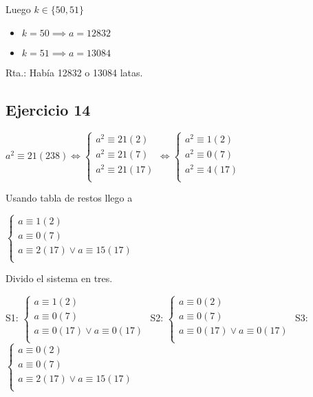 Luego $ k \in \{ 50,51 \} $

\begin{itemize}
    \item $ k = 50 \implies a = 12832 $
    \item $ k = 51 \implies a = 13084 $
\end{itemize}

Rta.: Había 12832 o 13084 latas.

\subsection{Ejercicio 14}

$ a^2 \equiv 21(238) \iff \begin{cases}
    a^2 \equiv 21(2) \\
    a^2 \equiv 21(7) \\
    a^2 \equiv 21(17) \\
\end{cases} 
\iff \begin{cases}
    a^2 \equiv 1(2) \\
    a^2 \equiv 0(7) \\
    a^2 \equiv 4(17) \\
\end{cases} $

Usando tabla de restos llego a

$ \begin{cases}
    a \equiv 1(2) \\
    a \equiv 0(7) \\
    a \equiv 2(17) \vee a\equiv 15(17) \\
\end{cases} $

Divido el sistema en tres.

S1: $ \begin{cases}
    a \equiv 1(2) \\
    a \equiv 0(7) \\
    a \equiv 0(17) \vee a\equiv 0(17) \\
\end{cases} $
S2: $ \begin{cases}
    a \equiv 0(2) \\
    a \equiv 0(7) \\
    a \equiv 0(17) \vee a\equiv 0(17) \\
\end{cases} $
S3: $ \begin{cases}
    a \equiv 0(2) \\
    a \equiv 0(7) \\
    a \equiv 2(17) \vee a\equiv 15(17) \\
\end{cases} $

